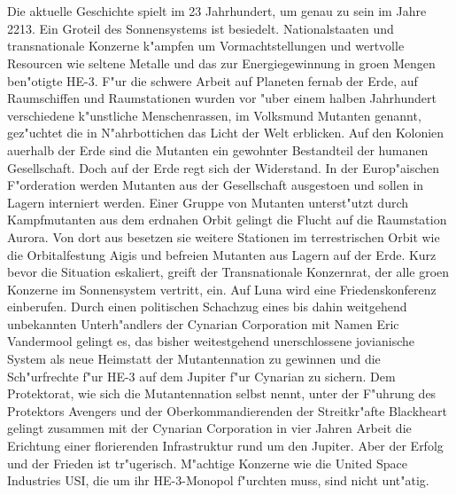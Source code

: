\chapter{\@introchaptername}

Die aktuelle Geschichte spielt im 23 Jahrhundert, um genau zu sein im Jahre 2213. Ein Gro\3teil des Sonnensystems ist besiedelt. Nationalstaaten und transnationale Konzerne k"ampfen um Vormachtstellungen und wertvolle Resourcen wie seltene Metalle und das zur Energiegewinnung in gro\3en Mengen ben"otigte HE-3. F"ur die schwere Arbeit auf Planeten fernab der Erde, auf Raumschiffen und Raumstationen wurden vor "uber einem halben Jahrhundert verschiedene k"unstliche Menschenrassen, im Volksmund Mutanten genannt, gez"uchtet die in N"ahrbottichen das Licht der Welt erblicken. Auf den Kolonien au\3erhalb der Erde sind die Mutanten ein gewohnter Bestandteil der humanen Gesellschaft. Doch auf der Erde regt sich der Widerstand. In der Europ"aischen F"orderation werden Mutanten aus der Gesellschaft ausgesto\3en und sollen in Lagern interniert werden. Einer Gruppe von Mutanten unterst"utzt durch Kampfmutanten aus dem erdnahen Orbit gelingt die Flucht auf die Raumstation Aurora. Von dort aus besetzen sie weitere Stationen im terrestrischen Orbit wie die Orbitalfestung Aigis und befreien Mutanten aus Lagern auf der Erde. Kurz bevor die Situation eskaliert, greift der Transnationale Konzernrat, der alle gro\3en Konzerne im Sonnensystem vertritt, ein. Auf Luna wird eine Friedenskonferenz einberufen. Durch einen politischen Schachzug eines bis dahin weitgehend unbekannten Unterh"andlers der Cynarian Corporation mit Namen Eric Vandermool gelingt es, das bisher weitestgehend unerschlossene jovianische System als neue Heimstatt der Mutantennation zu gewinnen und die Sch"urfrechte f"ur HE-3 auf dem Jupiter f"ur Cynarian zu sichern. Dem Protektorat, wie sich die Mutantennation selbst nennt, unter der F"uhrung des Protektors Avengers und der Oberkommandierenden der Streitkr"afte Blackheart gelingt zusammen mit der Cynarian Corporation in vier Jahren Arbeit die Erichtung einer florierenden Infrastruktur rund um den Jupiter. Aber der Erfolg und der Frieden ist tr"ugerisch. M"achtige Konzerne wie die United Space Industries USI, die um ihr HE-3-Monopol f"urchten muss, sind nicht unt"atig.